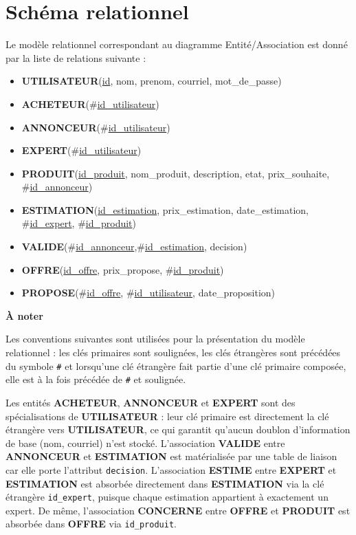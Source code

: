 \documentclass{article}
\theoremstyle{plain}
\theoremstyle{definition}
\newcommand{\pk}[1]{\uline{#1}} %
\newcommand{\fk}[1]{\#\uline{#1}} %
\begin{document}
\pagebreak
\section*{Schéma relationnel}
Le modèle relationnel correspondant au diagramme Entité/Association est donné par
la liste de relations suivante :
\begin{itemize}
    \item \textbf{UTILISATEUR}(\pk{id}, nom, prenom, courriel, mot\_de\_passe)

    \item \textbf{ACHETEUR}({\fk{id\_utilisateur}})

    \item \textbf{ANNONCEUR}({\fk{id\_utilisateur}})

    \item \textbf{EXPERT}({\fk{id\_utilisateur}})

    \item \textbf{PRODUIT}(\pk{id\_produit}, nom\_produit, description, etat,
    prix\_souhaite, \fk{id\_annonceur})

    \item \textbf{ESTIMATION}(\pk{id\_estimation}, prix\_estimation, date\_estimation, \fk{id\_expert}, \fk{id\_produit})

    \item \textbf{VALIDE}({\fk{id\_annonceur}},{\fk{id\_estimation}},
    decision)

    \item \textbf{OFFRE}(\pk{id\_offre}, prix\_propose, \fk{id\_produit})

        
    \item \textbf{PROPOSE}(\fk{id\_offre}, \fk{id\_utilisateur}, date\_proposition)
\end{itemize}
\vspace{0.5cm}
\noindent
\textbf{À noter}
\vspace{0.2cm}

\noindent
Les conventions suivantes sont utilisées pour la présentation du modèle relationnel :
les clés primaires sont soulignées, les clés étrangères sont précédées du symbole
\texttt{\#} et lorsqu'une clé étrangère fait partie d'une clé primaire composée,
elle est à la fois précédée de \texttt{\#} et soulignée.

\vspace{0.3cm}
\noindent
Les entités \textbf{ACHETEUR}, \textbf{ANNONCEUR} et \textbf{EXPERT} sont des
spécialisations de \textbf{UTILISATEUR} : leur clé primaire est directement la clé
étrangère vers \textbf{UTILISATEUR}, ce qui garantit qu'aucun doublon d'information
de base (nom, courriel) n'est stocké.
L'association \textbf{VALIDE} entre \textbf{ANNONCEUR} et \textbf{ESTIMATION} est
matérialisée par une table de liaison car elle porte l'attribut \texttt{decision}.
L'association \textbf{ESTIME} entre \textbf{EXPERT} et \textbf{ESTIMATION} est
absorbée directement dans \textbf{ESTIMATION} via la clé étrangère
\texttt{id\_expert}, puisque chaque estimation appartient à exactement un expert.
De même, l'association \textbf{CONCERNE} entre \textbf{OFFRE} et \textbf{PRODUIT}
est absorbée dans \textbf{OFFRE} via \texttt{id\_produit}.
\end{document}
